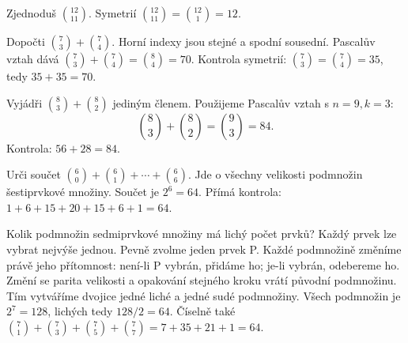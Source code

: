 \documentclass[11pt,a4paper]{article}
\begin{document}
\begin{zadaniReseniBox}[title={Úloha C1}]
Zjednoduš \(\binom{12}{11}\).
\tcblower
Symetrií $\binom{12}{11}=\binom{12}{1}=12$.
\end{zadaniReseniBox}

\begin{zadaniReseniBox}[title={Úloha C2}]
Dopočti \(\binom73+\binom74\).
\tcblower
Horní indexy jsou stejné a spodní sousední. Pascalův vztah dává $\binom73+\binom74=\binom84=70$. Kontrola symetrií: $\binom73=\binom74=35$, tedy $35+35=70$.
\end{zadaniReseniBox}

\begin{zadaniReseniBox}[title={Úloha C3}]
Vyjádři \(\binom83+\binom82\) jediným členem.
\tcblower
Použijeme Pascalův vztah s $n=9,k=3$:
\[
\binom83+\binom82=\binom93=84.
\]
Kontrola: $56+28=84$.
\end{zadaniReseniBox}

\begin{zadaniReseniBox}[title={Úloha C4}]
Urči součet \(\binom60+\binom61+\cdots+\binom66\).
\tcblower
Jde o všechny velikosti podmnožin šestiprvkové množiny. Součet je $2^6=64$. Přímá kontrola: $1+6+15+20+15+6+1=64$.
\end{zadaniReseniBox}

\begin{zadaniReseniBox}[title={Úloha C5}]
Kolik podmnožin sedmiprvkové množiny má lichý počet prvků? Každý prvek lze vybrat nejvýše jednou.
\tcblower
Pevně zvolme jeden prvek P. Každé podmnožině změníme právě jeho přítomnost: není-li P vybrán, přidáme ho; je-li vybrán, odebereme ho. Změní se parita velikosti a opakování stejného kroku vrátí původní podmnožinu. Tím vytváříme dvojice jedné liché a jedné sudé podmnožiny. Všech podmnožin je $2^7=128$, lichých tedy $128/2=64$. Číselně také $\binom71+\binom73+\binom75+\binom77=7+35+21+1=64$.
\end{zadaniReseniBox}


\end{document}
